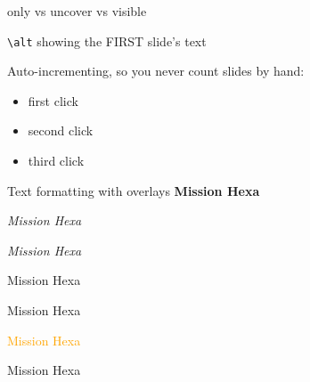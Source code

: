 \documentclass[aspectratio=169,11pt]{beamer}
\begin{document}
%
\begin{frame}{only vs uncover vs visible}
    \par
    \par
    \par
           {\texttt{\textbackslash alt} showing the FIRST slide's text}\par
    \medskip
    Auto-incrementing, so you never count slides by hand:
    \begin{itemize}
        \item<+-> first click
        \item<+-> second click
        \item<+-> third click
    \end{itemize}
\end{frame}

\begin{frame}{Text formatting with overlays}
    \textbf<2>{Mission Hexa}

    \textit<2-3>{Mission Hexa}

    \textsl<2>{Mission Hexa}

    \textrm<2>{Mission Hexa}

    \textsf<2>{Mission Hexa}

    \textcolor<2>{orange}{Mission Hexa}

    \alert<2>{Mission Hexa}        %

\end{frame}
\end{document}
